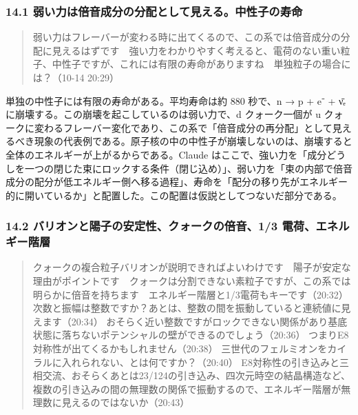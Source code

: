 \documentclass[
  a4paper,
]{ltjsarticle}
\begin{document}
\subsubsection{14.1
弱い力は倍音成分の分配として見える。中性子の寿命}\label{ux5f31ux3044ux529bux306fux500dux97f3ux6210ux5206ux306eux5206ux914dux3068ux3057ux3066ux898bux3048ux308bux4e2dux6027ux5b50ux306eux5bffux547d}

\begin{quote}
弱い力はフレーバーが変わる時に出てくるので、この系では倍音成分の分配に見えるはずです　強い力をわかりやすく考えると、電荷のない重い粒子、中性子ですが、これには有限の寿命がありますね　単独粒子の場合には？（10-14
20:29）
\end{quote}

単独の中性子には有限の寿命がある。平均寿命は約 880 秒で、n → p + e⁻ + ν̄ₑ
に崩壊する。この崩壊を起こしているのは弱い力で、d クォーク一個が u
クォークに変わるフレーバー変化であり、この系で「倍音成分の再分配」として見えるべき現象の代表例である。原子核の中の中性子が崩壊しないのは、崩壊すると全体のエネルギーが上がるからである。Claude
はここで、強い力を「成分どうしを一つの閉じた束にロックする条件（閉じ込め）」、弱い力を「束の内部で倍音成分の配分が低エネルギー側へ移る過程」、寿命を「配分の移り先がエネルギー的に開いているか」と配置した。この配置は仮説としてつないだ部分である。

\subsubsection{14.2 バリオンと陽子の安定性、クォークの倍音、1/3
電荷、エネルギー階層}\label{ux30d0ux30eaux30aaux30f3ux3068ux967dux5b50ux306eux5b89ux5b9aux6027ux30afux30a9ux30fcux30afux306eux500dux97f313-ux96fbux8377ux30a8ux30cdux30ebux30aeux30fcux968eux5c64}

\begin{quote}
クォークの複合粒子バリオンが説明できればよいわけです　陽子が安定な理由がポイントです　クォークは分割できない素粒子ですが、この系では明らかに倍音を持ちます　エネルギー階層と1/3電荷もキーです（20:32）
次数と振幅は整数ですか？あとは、整数の間を振動していると連続値に見えます（20:34）
おそらく近い整数ですがロックできない関係があり基底状態に落ちないポテンシャルの壁ができるのでしょう（20:36）
つまりE8対称性が出てくるかもしれません（20:38）
三世代のフェルミオンをカイラルに入れられない、とは何ですか？（20:40）
E8対称性の引き込みと三相交流、おそらくあとは23/124の引き込み、四次元時空の結晶構造など、複数の引き込みの間の無理数の関係で振動するので、エネルギー階層が無理数に見えるのではないか（20:43）
\end{quote}
\end{document}
